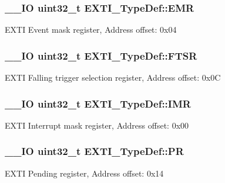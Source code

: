 \subsubsection[{E\+M\+R}]{\setlength{\rightskip}{0pt plus 5cm}\+\_\+\+\_\+\+I\+O uint32\+\_\+t E\+X\+T\+I\+\_\+\+Type\+Def\+::\+E\+M\+R}\label{struct_e_x_t_i___type_def_a9c5bff67bf9499933959df7eb91a1bd6}
E\+X\+T\+I Event mask register, Address offset\+: 0x04 \hypertarget{struct_e_x_t_i___type_def_aee667dc148250bbf37fdc66dc4a9874d}{}
\subsubsection[{F\+T\+S\+R}]{\setlength{\rightskip}{0pt plus 5cm}\+\_\+\+\_\+\+I\+O uint32\+\_\+t E\+X\+T\+I\+\_\+\+Type\+Def\+::\+F\+T\+S\+R}\label{struct_e_x_t_i___type_def_aee667dc148250bbf37fdc66dc4a9874d}
E\+X\+T\+I Falling trigger selection register, Address offset\+: 0x0\+C \hypertarget{struct_e_x_t_i___type_def_a17d061db586d4a5aa646b68495a8e6a4}{}
\subsubsection[{I\+M\+R}]{\setlength{\rightskip}{0pt plus 5cm}\+\_\+\+\_\+\+I\+O uint32\+\_\+t E\+X\+T\+I\+\_\+\+Type\+Def\+::\+I\+M\+R}\label{struct_e_x_t_i___type_def_a17d061db586d4a5aa646b68495a8e6a4}
E\+X\+T\+I Interrupt mask register, Address offset\+: 0x00 \hypertarget{struct_e_x_t_i___type_def_a133294b87dbe6a01e8d9584338abc39a}{}
\subsubsection[{P\+R}]{\setlength{\rightskip}{0pt plus 5cm}\+\_\+\+\_\+\+I\+O uint32\+\_\+t E\+X\+T\+I\+\_\+\+Type\+Def\+::\+P\+R}\label{struct_e_x_t_i___type_def_a133294b87dbe6a01e8d9584338abc39a}
E\+X\+T\+I Pending register, Address offset\+: 0x14 \hypertarget{struct_e_x_t_i___type_def_ac019d211d8c880b327a1b90a06cc0675}{}
